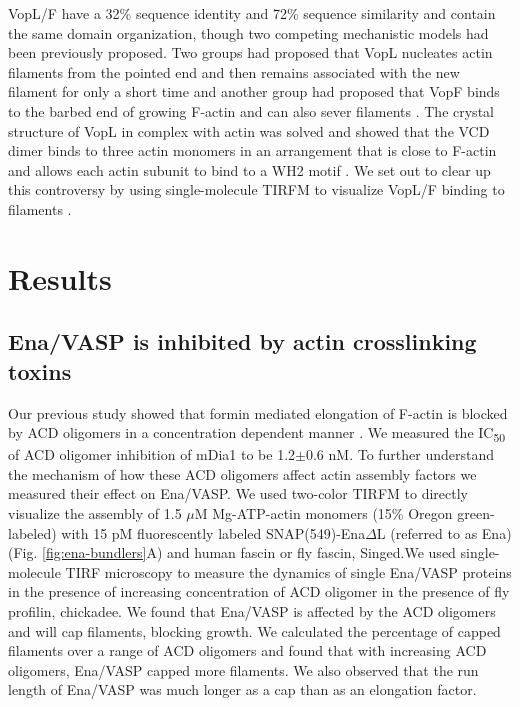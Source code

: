 VopL/F have a 32\% sequence identity and 72\% sequence similarity and contain the same domain organization, though two competing mechanistic models had been previously proposed. Two groups had proposed that VopL nucleates actin filaments from the pointed end and then remains associated with the new filament for only a short time \citep{namgoong_mechanism_2011, yu_mechanism_2011} and another group had proposed that VopF binds to the barbed end of growing F-actin and can also sever filaments \citep{pernier_dimeric_2013}. The crystal structure of VopL in complex with actin was solved and showed that the VCD dimer binds to three actin monomers in an arrangement that is close to F-actin and allows each actin subunit to bind to a WH2 motif \citep{zahm_bacterial_2013}. We set out to clear up this controversy by using single-molecule TIRFM to visualize VopL/F binding to filaments \citep{burke_bacterial_2017}. 

\section{Results}\label{ch04-results}

\subsection{Ena/VASP is inhibited by actin crosslinking toxins}\label{ena-acd-oligomers}
Our previous study showed that formin mediated elongation of F-actin is blocked by ACD oligomers in a concentration dependent manner \citep{heisler_acd_2015}. We measured the IC\textsubscript{50} of ACD oligomer inhibition of mDia1 to be 1.2$\pm$0.6 nM. To further understand the mechanism of how these ACD oligomers affect actin assembly factors we measured their effect on Ena/VASP. We used two-color TIRFM to directly visualize the assembly of 1.5 $\mu$M Mg-ATP-actin monomers (15\% Oregon green-labeled) with 15 pM fluorescently labeled SNAP(549)-Ena$\Delta$L (referred to as Ena) (Fig. \ref{fig:ena-bundlers}A) and human fascin or fly fascin, Singed.We used single-molecule TIRF microscopy to measure the dynamics of single Ena/VASP proteins in the presence of increasing concentration of ACD oligomer in the presence of fly profilin, chickadee. We found that Ena/VASP is affected by the ACD oligomers and will cap filaments, blocking growth. We calculated the percentage of capped filaments over a range of ACD oligomers and found that with increasing ACD oligomers, Ena/VASP capped more filaments. We also observed that the run length of Ena/VASP was much longer as a cap than as an elongation factor. 

